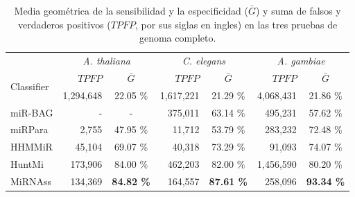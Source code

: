 \begin{table}[tpb]
	\footnotesize
	\centering
	\caption[Resultados en genomá completo]{Media geométrica de la sensibilidad y la especificidad ($\bar{G}$) y suma de falsos y verdaderos positivos
		($TPFP$, por sus siglas en ingles) en las tres pruebas de genoma completo.
	\label{tab:wholegenome}}
	\begin{tabular}{@{}lrcrcrc@{}} \toprule
		&	\multicolumn{2}{c}{\textit{A. thaliana}}
		&	\multicolumn{2}{c}{\textit{C. elegans}}
		&	\multicolumn{2}{c}{\textit{A. gambiae}} \\
		\multirow{2}{*}{Classifier}	&	 $TPFP$		&	 $\bar{G}$
						&	 $TPFP$			&	 $\bar{G}$
						&	 $TPFP$			&	 $\bar{G}$	\\\midrule
		{\small Mirident}	&	 1,294,648		&	 22.05 \%
					&	 1,617,221		&	 21.29 \%
					&	 4,068,431		&	 21.86 \%	\\
		{\small miR-BAG}	&	 -			&	 -
					&	 375,011		&	 63.14 \%
					&	 495,231		&	 57.62 \%	\\
		{\small miRPara}	&	 2,755			&	 47.95 \%
					&	 11,712			&	 53.79 \%
					&	 283,232		&	 72.48 \%	\\
		{\small HHMMiR}		&	 45,104			&	 69.07 \%
					&	 40,318			&	 73.29 \%
					&	 91,093			&	 74.07 \%	\\
		{\small HuntMi}		&	 173,906		&	 84.00 \%
					&	 462,203		&	 82.00 \%
					&	 1,456,590		&	 80.20 \%	\\
		{\small MiRNAss}	&	134,369		&	\textbf{84.82 \%}
					&	 164,557		&	 \textbf{87.61 \%}
					&	 258,096		&	 \textbf{93.34 \%}	\\\bottomrule
	\end{tabular}
\end{table}
